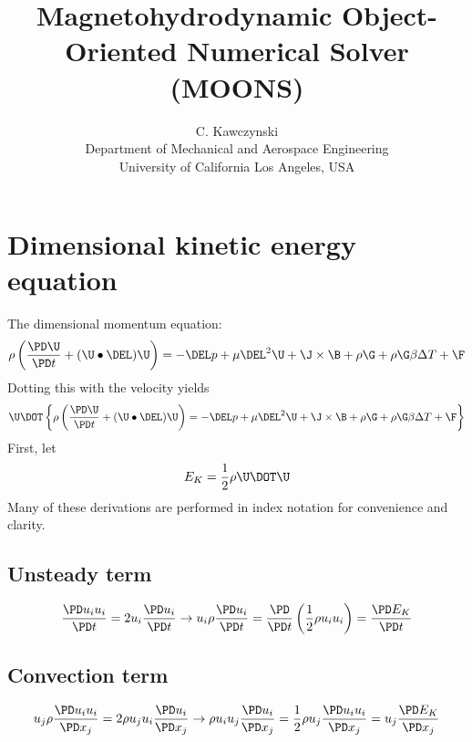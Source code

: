\documentclass[11pt]{article}
\begin{document}
\doublespacing
\title{Magnetohydrodynamic Object-Oriented Numerical Solver (MOONS)}
\author{C. Kawczynski \\
Department of Mechanical and Aerospace Engineering \\
University of California Los Angeles, USA\\
}
\maketitle

\section{Dimensional kinetic energy equation}
The dimensional momentum equation:
\begin{equation}
	\rho \left( \frac{\PD \U}{\PD t} + (\U \bullet \DEL) \U \right) =
	-\DEL p + \mu \DEL^2 \U + \J \times \B + \rho \G + \rho \G \beta \Delta T + \F
\end{equation}
Dotting this with the velocity yields
\begin{equation}
	\U \DOT \left\{ \rho \left( \frac{\PD \U}{\PD t} + (\U \bullet \DEL) \U \right) =
	-\DEL p + \mu \DEL^2 \U + \J \times \B + \rho \G + \rho \G \beta \Delta T + \F \right\}
\end{equation}
First, let
\begin{equation}
	E_K = \frac{1}{2} \rho \U \DOT \U
\end{equation}
Many of these derivations are performed in index notation for convenience and clarity.
\subsection{Unsteady term}
\begin{equation}
	\frac{\PD u_i u_i}{\PD t} =
	2 u_i \frac{\PD u_i}{\PD t}
	\rightarrow
	u_i \rho \frac{\PD u_i}{\PD t} =
	\frac{\PD}{\PD t} \left( \frac{1}{2} \rho u_i u_i \right) =
	\frac{\PD E_K}{\PD t}
\end{equation}

\subsection{Convection term}
\begin{equation}
	u_j \rho \frac{\PD u_i u_i}{\PD x_j} =
	2 \rho u_j u_i \frac{\PD u_i}{\PD x_j}
	\rightarrow
	\rho u_i u_j \frac{\PD u_i}{\PD x_j} =
	\frac{1}{2} \rho u_j \frac{\PD u_i u_i}{\PD x_j}
	= u_j \frac{\PD E_K}{\PD x_j}
\end{equation}
\end{document}
